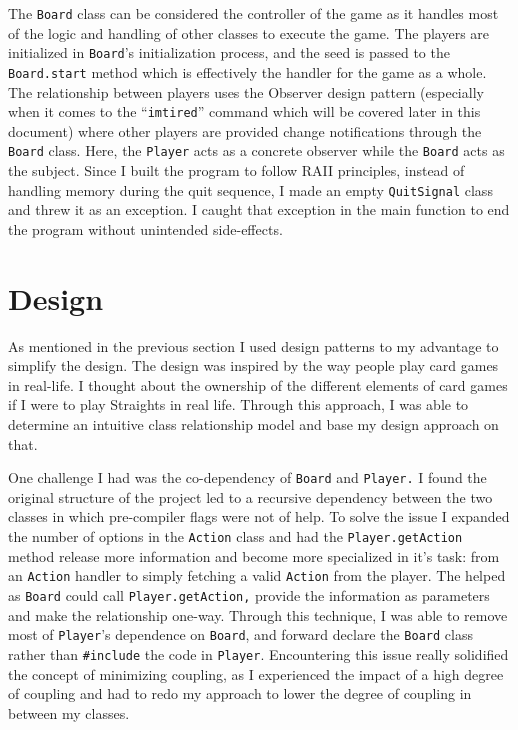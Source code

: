 \documentclass[12pt]{article}
\begin{document}
		The \texttt{Board} class can be considered the controller of the game as it handles most of the logic and handling of other classes to execute the game. The players are initialized in \texttt{Board}'s initialization process, and the seed is passed to the \texttt{Board.start} method which is effectively the handler for the game as a whole. The relationship between players uses the Observer design pattern (especially when it comes to the ``\texttt{imtired}'' command which will be covered later in this document) where other players are provided change notifications through the \texttt{Board} class. Here, the \texttt{Player} acts as a concrete observer while the \texttt{Board} acts as the subject. Since I built the program to follow RAII principles, instead of handling memory during the quit sequence, I made an empty \texttt{QuitSignal} class and threw it as an exception. I caught that exception in the main function to end the program without unintended side-effects.

	\section{Design}
		As mentioned in the previous section I used design patterns to my advantage to simplify the design. The design was inspired by the way people play card games in real-life. I thought about the ownership of the different elements of card games if I were to play Straights in real life. Through this approach, I was able to determine an intuitive class relationship model and base my design approach on that.

		One challenge I had was the co-dependency of \texttt{Board} and \texttt{Player.} I found the original structure of the project led to a recursive dependency between the two classes in which pre-compiler flags were not of help. To solve the issue I expanded the number of options in the \texttt{Action} class and had the \texttt{Player.getAction} method release more information and become more specialized in it's task: from an \texttt{Action} handler to simply fetching a valid \texttt{Action} from the player. The helped as \texttt{Board} could call \texttt{Player.getAction,} provide the information as parameters and make the relationship one-way. Through this technique, I was able to remove most of \texttt{Player}'s dependence on \texttt{Board}, and forward declare the \texttt{Board} class rather than \texttt{\#include} the code in \texttt{Player}.
		Encountering this issue really solidified the concept of minimizing coupling, as I experienced the impact of a high degree of coupling and had to redo my approach to lower the degree of coupling in between my classes.
\end{document}
